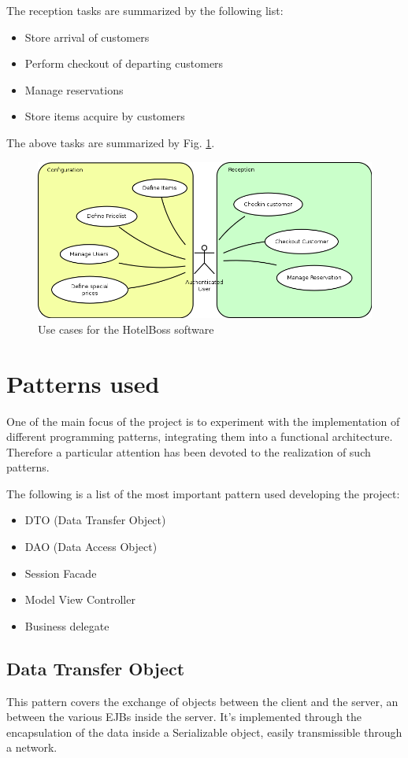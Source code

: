 \documentclass [11pt]{article}
\begin{document}
The reception tasks are summarized by the following list:
\begin{itemize}
\item Store arrival of customers
\item Perform checkout of departing customers
\item Manage reservations
\item Store items acquire by customers
\end{itemize}

The above tasks are summarized by Fig. \ref{fig:uses}.

\begin {figure}[h]
\includegraphics[width=\textwidth]{images/uses.png}
\caption {Use cases for the HotelBoss software}
\label{fig:uses}
\end {figure}

\section{Patterns used}
One of the main focus of the project is to experiment with the
implementation of different programming patterns, integrating them into a
functional architecture.
Therefore a particular attention has been devoted to the realization of
such patterns.

The following is a list of the most important pattern used developing the
project:
\begin{itemize}
\item DTO (Data Transfer Object)
\item DAO (Data Access Object)
\item Session Facade
\item Model View Controller
\item Business delegate
\end{itemize}

\subsection{Data Transfer Object}
This pattern covers the exchange of objects between the client and the
server, an between the various EJBs inside the server.
It's implemented through the encapsulation of the data inside a
Serializable object, easily transmissible through a network.
\end{document}

